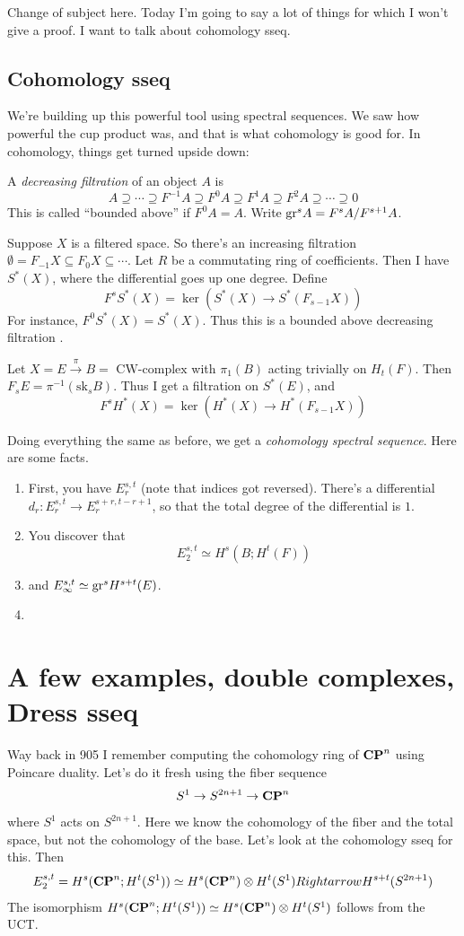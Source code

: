 Change of subject here.
Today I'm going to say a lot of things for which I won't give a proof.
I want to talk about cohomology sseq.
\subsection{Cohomology sseq}
We're building up this powerful tool using spectral sequences.
We saw how powerful the cup product was, and that is what cohomology is good for.
In cohomology, things get turned upside down:
\begin{definition}
    A \emph{decreasing filtration} of an object $A$ is
    $$A\supseteq\cdots\supseteq F^{-1} A\supseteq F^0 A \supseteq F^1 A\supseteq F^2 A\supseteq \cdots\supseteq 0$$
    This is called ``bounded above'' if $F^0 A = A$.
    Write $\mathrm{gr}^s A = F^sA/F^{s+1}A$.
\end{definition}
\begin{example}
    Suppose $X$ is a filtered space.
    So there's an increasing filtration $\emptyset=F_{-1}X\subseteq F_0X\subseteq\cdots$.
    Let $R$ be a commutating ring of coefficients.
    Then I have $S^\ast(X)$, where the differential goes up one degree.
    Define
    $$F^s S^\ast(X) = \ker(S^\ast(X)\to S^\ast(F_{s-1}X))$$
    For instance, $F^0 S^\ast(X) = S^\ast(X)$.
    Thus this is a bounded above decreasing filtration .
\end{example}
\begin{example}
    Let $X=E\xrightarrow{\pi}B = \text{ CW-complex}$ with $\pi_1(B)$ acting trivially on $H_t(F)$.
    Then $F_s E = \pi^{-1}(\mathrm{sk}_s B)$.
    Thus I get a filtration on $S^\ast(E)$, and
    $$
    F^s H^\ast(X) = \ker(H^\ast(X)\to H^\ast(F_{s-1}X))
    $$
\end{example}
Doing everything the same as before, we get a \emph{cohomology spectral sequence}.
Here are some facts.
\begin{enumerate}
    \item First, you have $E_r^{s,t}$ (note that indices got reversed).
	There's a differential $d_r:E^{s,t}_r \to E_r^{s+r,t-r+1}$, so that the total degree of the differential is $1$.
    \item You discover that
	$$
	E^{s,t}_2 \simeq H^s(B;H^t(F))
	$$
    \item and $E^{s,t}_\infty \simeq \mathrm{gr}^s H^{s+t}(E)$.
    \item 
\end{enumerate}
\section{A few examples, double complexes, Dress sseq}
Way back in 905 I remember computing the cohomology ring of $\mathbf{CP}^n$ using Poincare duality.
Let's do it fresh using the fiber sequence
$$
S^1\to S^{2n+1}\to \mathbf{CP}^n
$$
where $S^1$ acts on $S^{2n+1}$.
Here we know the cohomology of the fiber and the total space, but not the cohomology of the base.
Let's look at the cohomology sseq for this.
Then
$$
E_2^{s,t} = H^s(\mathbf{CP}^n;H^t(S^1)) \simeq H^s(\mathbf{CP}^n)\otimes H^t(S^1) Rightarrow H^{s+t}(S^{2n+1})
$$
The isomorphism $H^s(\mathbf{CP}^n;H^t(S^1)) \simeq H^s(\mathbf{CP}^n)\otimes H^t(S^1)$ follows from the UCT.

